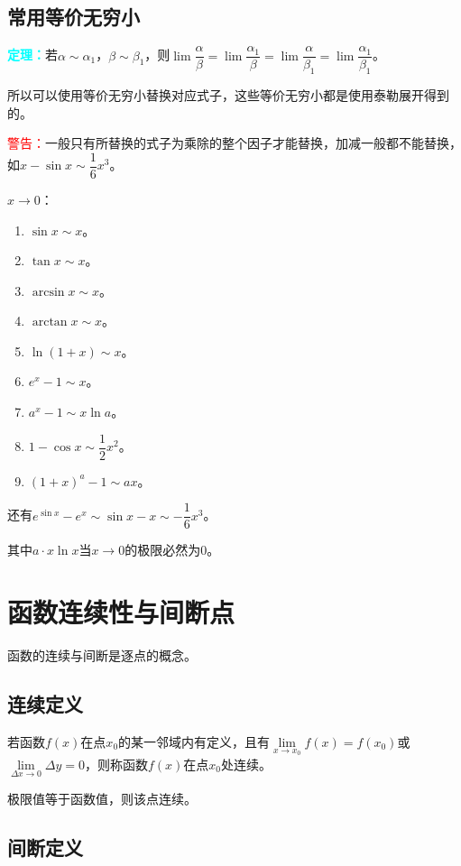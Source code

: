 \documentclass[UTF8, 12pt]{ctexart}
\begin{document}
\subsection{常用等价无穷小}

\textcolor{aqua}{\textbf{定理：}}若$\alpha\sim\alpha_1$，$\beta\sim\beta_1$，则$\lim\dfrac{\alpha}{\beta}=\lim\dfrac{\alpha_1}{\beta}=\lim\dfrac{\alpha}{\beta_1}=\lim\dfrac{\alpha_1}{\beta_1}$。

所以可以使用等价无穷小替换对应式子，这些等价无穷小都是使用泰勒展开得到的。

\textcolor{red}{警告：}一般只有所替换的式子为乘除的整个因子才能替换，加减一般都不能替换，如$x-\sin x\sim\dfrac{1}{6}x^3$。

$x\to 0$：

\begin{enumerate}
    \item $\sin x\sim x$。
    \item $\tan x\sim x$。
    \item $\arcsin x\sim x$。
    \item $\arctan x\sim x$。
    \item $\ln(1+x)\sim x$。
    \item $e^x-1\sim x$。
    \item $a^x-1\sim x\ln a$。
    \item $1-\cos x\sim\dfrac{1}{2}x^2$。
    \item $(1+x)^a-1\sim ax$。
\end{enumerate}

还有$e^{\sin x}-e^x\sim\sin x-x\sim-\dfrac{1}{6}x^3$。

其中$a\cdot x\ln x$当$x\to 0$的极限必然为0。

\section{函数连续性与间断点}

函数的连续与间断是逐点的概念。

\subsection{连续定义}

若函数$f(x)$在点$x_0$的某一邻域内有定义，且有$\lim\limits_{x\to x_0}f(x)=f(x_0)$或$\lim\limits_{\Delta x\to 0}\Delta y=0$，则称函数$f(x)$在点$x_0$处连续。

极限值等于函数值，则该点连续。

\subsection{间断定义}
\end{document}
